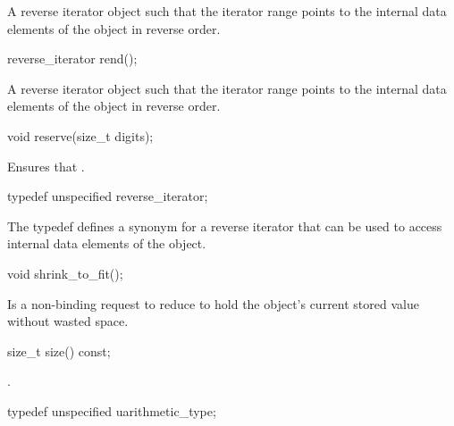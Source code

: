 \begin{addedblock}
\begin{itemdescr}
\returns A reverse iterator object such that the iterator range \tcode{[crbegin(), crend())} points to the internal data elements of the  object in reverse order.		
\end{itemdescr}

\begin{itemdecl}
reverse_iterator rend();		
\end{itemdecl}

\begin{itemdescr}
\returns A reverse iterator object such that the iterator range \tcode{[crbegin(), crend())} points to the internal data elements of the  object in reverse order.		
\end{itemdescr}

\begin{itemdecl}
void reserve(size_t digits);		
\end{itemdecl}

\begin{itemdescr}
\effects Ensures that .		
\end{itemdescr}

\begin{itemdecl}
typedef unspecified reverse_iterator;		
\end{itemdecl}

\begin{itemdescr}
The typedef defines a synonym for a reverse iterator that can be used to access internal data elements of the  object.		
\end{itemdescr}

\begin{itemdecl}
void shrink_to_fit();		
\end{itemdecl}

\begin{itemdescr}
\effect Is a non-binding request to reduce  to hold the  object's current stored value without wasted space.		
\end{itemdescr}

\begin{itemdecl}
size_t size() const;		
\end{itemdecl}

\begin{itemdescr}
\returns {}.		
\end{itemdescr}

\begin{itemdecl}
typedef unspecified uarithmetic_type;		
\end{itemdecl}


\end{addedblock}
